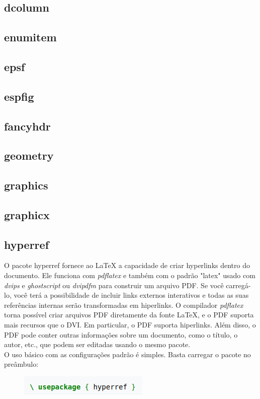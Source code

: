 \documentclass[12pt]{article}
\begin{document}
		\subsection{dcolumn}
		
		\subsection{enumitem}
		
		\subsection{epsf}
		
		\subsection{espfig}
		
		\subsection{fancyhdr}
		
		\subsection{geometry}
		
		\subsection{graphics}
		
		\subsection{graphicx}
		
		\subsection{hyperref}
			O pacote hyperref fornece ao LaTeX a capacidade de criar hyperlinks dentro do documento. Ele funciona com \textit{pdflatex} e também com o padrão "latex" usado com \textit{dvips} e \textit{ghostscript} ou \textit{dvipdfm} para construir um arquivo PDF. Se você carregá-lo, você terá a possibilidade de incluir links externos interativos e todas as suas referências internas serão transformadas em hiperlinks. O compilador \textit{pdflatex} torna possível criar arquivos PDF diretamente da fonte LaTeX, e o PDF suporta mais recursos que o DVI. Em particular, o PDF suporta hiperlinks. Além disso, o PDF pode conter outras informações sobre um documento, como o título, o autor, etc., que podem ser editadas usando o mesmo pacote.\\
			O uso básico com as configurações padrão é simples. Basta carregar o pacote no preâmbulo:
			\begin{figure}[h]
				\centering
				\includegraphics[scale=0.6]{caa.png}
			\end{figure}
		
\end{document}
